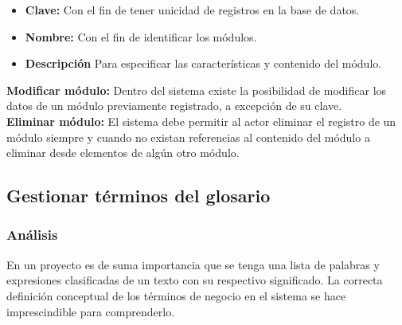 \begin{itemize}
	\item \textbf{Clave:} Con el fin de tener unicidad de registros en la base de datos.
	\item \textbf{Nombre:} Con el fin de identificar los módulos.
	\item \textbf{Descripción} Para especificar las características y contenido del módulo.
\end{itemize}

\textbf {Modificar módulo:}
Dentro del sistema existe la posibilidad de modificar los datos de un módulo previamente registrado, a excepción de su clave.\\

\textbf {Eliminar módulo:} 
El sistema debe permitir al actor eliminar el registro de un módulo siempre y cuando no existan referencias al contenido del módulo a eliminar desde elementos de algún otro módulo.


\subsection{Gestionar términos del glosario}
\subsubsection {Análisis}
En un proyecto es de suma importancia que se tenga una lista de palabras y expresiones clasificadas de un texto con su respectivo significado. La correcta definición conceptual de los términos de negocio en el sistema se hace imprescindible para comprenderlo.

